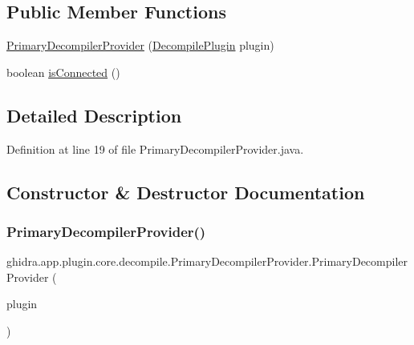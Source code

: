 \subsection*{Public Member Functions}
\begin{DoxyCompactItemize}
\item 
\mbox{\hyperlink{classghidra_1_1app_1_1plugin_1_1core_1_1decompile_1_1_primary_decompiler_provider_ad12a7ed7a3a1f0e7b08c08bbf539e321}{Primary\+Decompiler\+Provider}} (\mbox{\hyperlink{classghidra_1_1app_1_1plugin_1_1core_1_1decompile_1_1_decompile_plugin}{Decompile\+Plugin}} plugin)
\item 
boolean \mbox{\hyperlink{classghidra_1_1app_1_1plugin_1_1core_1_1decompile_1_1_primary_decompiler_provider_ad8cede17b8154402a7c101f3a80bc78f}{is\+Connected}} ()
\end{DoxyCompactItemize}


\subsection{Detailed Description}


Definition at line 19 of file Primary\+Decompiler\+Provider.\+java.



\subsection{Constructor \& Destructor Documentation}
\mbox{\label{classghidra_1_1app_1_1plugin_1_1core_1_1decompile_1_1_primary_decompiler_provider_ad12a7ed7a3a1f0e7b08c08bbf539e321}} 
\subsubsection{\texorpdfstring{PrimaryDecompilerProvider()}{PrimaryDecompilerProvider()}}
{\footnotesize\ttfamily ghidra.\+app.\+plugin.\+core.\+decompile.\+Primary\+Decompiler\+Provider.\+Primary\+Decompiler\+Provider (\begin{DoxyParamCaption}\item[{\mbox{\hyperlink{classghidra_1_1app_1_1plugin_1_1core_1_1decompile_1_1_decompile_plugin}{Decompile\+Plugin}}}]{plugin }\end{DoxyParamCaption})\hspace{0.3cm}{\ttfamily [inline]}}



